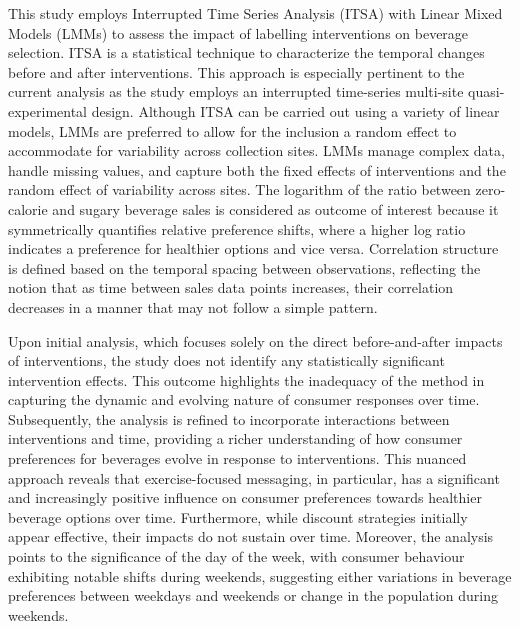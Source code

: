\documentclass[
]{article}
\begin{document}
This study employs Interrupted Time Series Analysis (ITSA) with Linear Mixed Models (LMMs) to assess the impact of labelling interventions on beverage selection. ITSA is a statistical technique to characterize the temporal changes before and after interventions. This approach is especially pertinent to the current analysis as the study employs an interrupted time-series multi-site quasi-experimental design. Although ITSA can be carried out using a variety of linear models, LMMs are preferred to allow for the inclusion a random effect to accommodate for variability across collection sites. LMMs manage complex data, handle missing values, and capture both the fixed effects of interventions and the random effect of variability across sites. The logarithm of the ratio between zero-calorie and sugary beverage sales is considered as outcome of interest because it symmetrically quantifies relative preference shifts, where a higher log ratio indicates a preference for healthier options and vice versa. Correlation structure is defined based on the temporal spacing between observations, reflecting the notion that as time between sales data points increases, their correlation decreases in a manner that may not follow a simple pattern.

Upon initial analysis, which focuses solely on the direct before-and-after impacts of interventions, the study does not identify any statistically significant intervention effects. This outcome highlights the inadequacy of the method in capturing the dynamic and evolving nature of consumer responses over time. Subsequently, the analysis is refined to incorporate interactions between interventions and time, providing a richer understanding of how consumer preferences for beverages evolve in response to interventions. This nuanced approach reveals that exercise-focused messaging, in particular, has a significant and increasingly positive influence on consumer preferences towards healthier beverage options over time. Furthermore, while discount strategies initially appear effective, their impacts do not sustain over time. Moreover, the analysis points to the significance of the day of the week, with consumer behaviour exhibiting notable shifts during weekends, suggesting either variations in beverage preferences between weekdays and weekends or change in the population during weekends.
\end{document}
